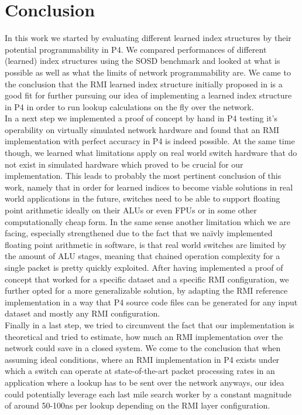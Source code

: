 
\chapter{Conclusion}
\label{ch:conclusion}
In this work we started by evaluating different learned index structures by their potential programmability in P4. We compared performances of different (learned) index structures using the SOSD benchmark \cite{sosd-neurips} and looked at what is possible as well as what the limits of network programmability are. We came to the conclusion that the RMI learned index structure initially proposed in \cite{rmi} is a good fit for further pursuing our idea of implementing a learned index structure in P4 in order to run lookup calculations on the fly over the network.\\

In a next step we implemented a proof of concept by hand in P4 testing it's operability on virtually simulated network hardware and found that an RMI implementation with perfect accuracy in P4 is indeed possible. At the same time though, we learned what limitations apply on real world switch hardware that do not exist in simulated hardware which proved to be crucial for our implementation. This leads to probably the most pertinent conclusion of this work, namely that in order for learned indices to become viable solutions in real world applications in the future, switches need to be able to support floating point arithmetic ideally on their ALUs or even FPUs or in some other computationally cheap form. In the same sense another limitation which we are facing, especially strengthened due to the fact that we naïvly implemented floating point arithmetic in software, is that real world switches are limited by the amount of ALU stages, meaning that chained operation complexity for a single packet is pretty quickly exploited. After having implemented a proof of concept that worked for a specific dataset and a specific RMI configuration, we further opted for a more generalizable solution, by adapting the RMI reference implementation \cite{cdfshop} in a way that P4 source code files can be generated for any input dataset and mostly any RMI configuration.\\

Finally in a last step, we tried to circumvent the fact that our implementation is theoretical and tried to estimate, how much an RMI implementation over the network could save in a closed system. We come to the conclusion that when assuming ideal conditions, where an RMI implementation in P4 exists under which a switch can operate at state-of-the-art packet processing rates in an application where a lookup has to be sent over the network anyways, our idea could potentially leverage each last mile search worker by a constant magnitude of around 50-100ns per lookup depending on the RMI layer configuration.


